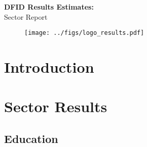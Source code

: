 \documentclass{article}\usepackage[]{graphicx}\usepackage[]{color}
\begin{document}







\vspace*{3cm}
{\noindent\Huge\textbf{DFID Results Estimates:} \\
Sector Report\par}

\vspace{12cm}

\begin{figure}[htbp]
    \centering
    \texttt{[image: ../figs/logo\_results.pdf]}
\end{figure}


\thispagestyle{empty}


\newpage

\tableofcontents
\thispagestyle{empty}

\newpage

\clearpage
\setcounter{page}{1}













\section{Introduction}



\section{Sector Results}


\subsection{Education}
\end{document}
